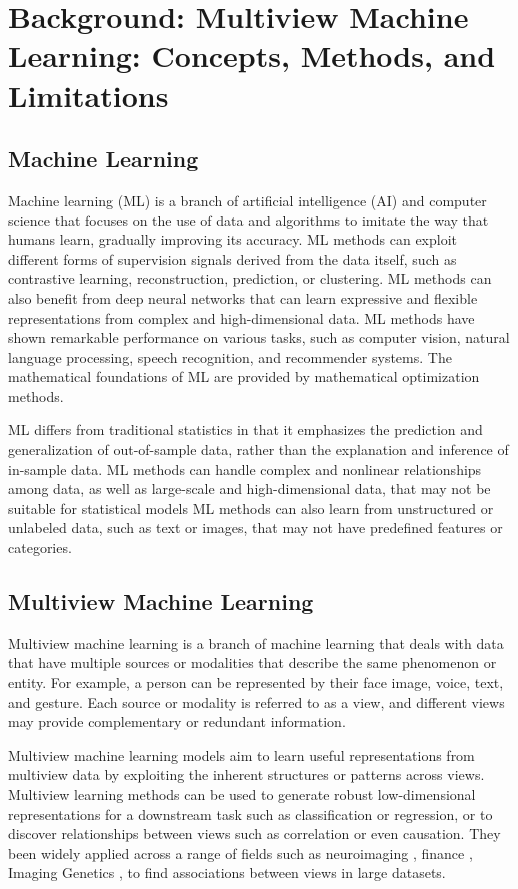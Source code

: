 \chapter{Background: Multiview Machine Learning: Concepts, Methods, and Limitations}
\label{chap:background}

\section{Machine Learning}

Machine learning (ML) is a branch of artificial intelligence (AI) and computer science that focuses on the use of data and algorithms to imitate the way that humans learn, gradually improving its accuracy. ML methods can exploit different forms of supervision signals derived from the data itself, such as contrastive learning, reconstruction, prediction, or clustering. ML methods can also benefit from deep neural networks that can learn expressive and flexible representations from complex and high-dimensional data. ML methods have shown remarkable performance on various tasks, such as computer vision, natural language processing, speech recognition, and recommender systems. The mathematical foundations of ML are provided by mathematical optimization methods.

ML differs from traditional statistics in that it emphasizes the prediction and generalization of out-of-sample data, rather than the explanation and inference of in-sample data. ML methods can handle complex and nonlinear relationships among data, as well as large-scale and high-dimensional data, that may not be suitable for statistical models ML methods can also learn from unstructured or unlabeled data, such as text or images, that may not have predefined features or categories.

\section{Multiview Machine Learning}

Multiview machine learning is a branch of machine learning that deals with data that have multiple sources or modalities that describe the same phenomenon or entity. For example, a person can be represented by their face image, voice, text, and gesture. Each source or modality is referred to as a view, and different views may provide complementary or redundant information.

Multiview machine learning models aim to learn useful representations from multiview data by exploiting the inherent structures or patterns across views. Multiview learning methods can be used to generate robust low-dimensional representations for a downstream task such as classification or regression, or to discover relationships between views such as correlation or even causation. They been widely applied across a range of fields such as neuroimaging \cite{Krishnan2011}, finance \cite{cassel2000measurement}, Imaging Genetics \cite{Hansen2021}, to find associations between views in large datasets.



